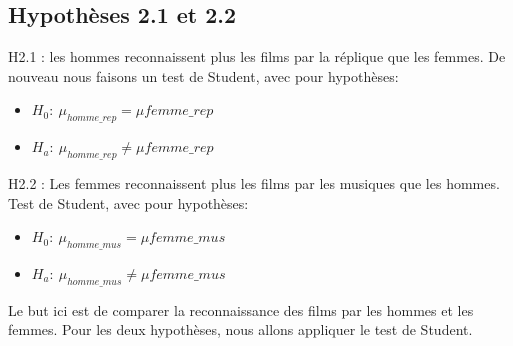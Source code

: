 \documentclass{article} %
\begin{document}

\subsection{ Hypothèses 2.1 et 2.2}
H2.1 : les hommes reconnaissent plus les films par la réplique que les femmes.
De nouveau nous faisons un test de Student, avec pour hypothèses:
\begin{itemize}
	\vspace{-0.2cm}
	\setlength\itemsep{0.0cm}
	\item $H_0: \ \mu_{homme\_rep} = \mu{femme\_rep}$
	\item $H_a: \ \mu_{homme\_rep} \ne \mu{femme\_rep}$
\end{itemize}
H2.2 : Les femmes reconnaissent plus les films par les musiques que les hommes.
Test de Student, avec pour hypothèses:
\begin{itemize}
	\vspace{-0.2cm}
	\setlength\itemsep{0.0cm}
	\item $H_0: \ \mu_{homme\_mus} = \mu{femme\_mus}$
	\item $H_a: \ \mu_{homme\_mus} \ne \mu{femme\_mus}$
\end{itemize}
Le but ici est de comparer la reconnaissance des films par les hommes et les femmes.
Pour les deux hypothèses, nous allons appliquer le test de Student.
\end{document}
